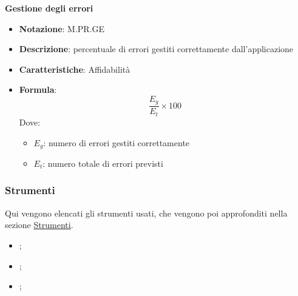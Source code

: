 \textbf{Gestione degli errori}
\begin{itemize}  
    \item \textbf{Notazione}: M.PR.GE
    \item \textbf{Descrizione}:  percentuale di errori gestiti correttamente dall'applicazione
    \item \textbf{Caratteristiche}: Affidabilità
    \item \textbf{Formula}: 
    \begin{equation}
        \frac{E_g}{E_t} \times 100
    \end{equation}
    Dove:
    \begin{itemize}
        \item $E_g$: numero di errori gestiti correttamente 
        \item $E_t$: numero totale di errori previsti
    \end{itemize}
\end{itemize}

\subsubsection{Strumenti}
Qui vengono elencati gli strumenti usati, che vengono poi approfonditi nella sezione \hyperref[sec:strumenti]{Strumenti}.

\begin{itemize}
    \item {};
    \item {};
    \item {};
\end{itemize}




